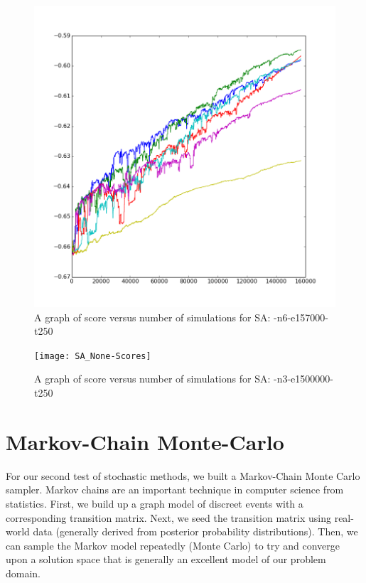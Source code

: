 \documentclass{article}
\begin{document}
\begin{figure}[H]
\begin{center}
\includegraphics[width=\textwidth]{SA_Chromo7-Scores}
\caption{A graph of score versus number of simulations for SA: -n6-e157000-t250}
\label{Fig:sa_score_n6}
\end{center}
\end{figure}

\begin{figure}[H]
\begin{center}
\texttt{[image: SA\_None-Scores]}
\caption{A graph of score versus number of simulations for SA: -n3-e1500000-t250}
\label{Fig:sa_score_none}
\end{center}
\end{figure}

\section{Markov-Chain Monte-Carlo}

For our second test of stochastic methods, we built a Markov-Chain Monte Carlo sampler.  Markov chains are an important technique in computer science from statistics.  First, we build up a graph model of discreet events with a corresponding transition matrix.  Next, we seed the transition matrix using real-world data (generally derived from posterior probability distributions).  Then, we can sample the Markov model repeatedly (Monte Carlo) to try and converge upon a solution space that is generally an excellent model of our problem domain.
\end{document}
